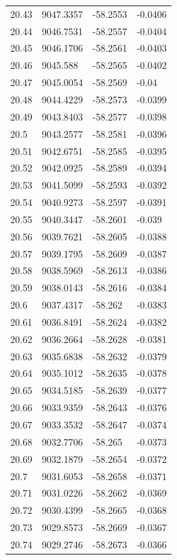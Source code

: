 \begin{table}[H]
\begin{tabular}{llll}
20.43 & 9047.3357 & -58.2553 & -0.0406 \\
20.44 & 9046.7531 & -58.2557 & -0.0404 \\
20.45 & 9046.1706 & -58.2561 & -0.0403 \\
20.46 & 9045.588 & -58.2565 & -0.0402 \\
20.47 & 9045.0054 & -58.2569 & -0.04 \\
20.48 & 9044.4229 & -58.2573 & -0.0399 \\
20.49 & 9043.8403 & -58.2577 & -0.0398 \\
20.5 & 9043.2577 & -58.2581 & -0.0396 \\
20.51 & 9042.6751 & -58.2585 & -0.0395 \\
20.52 & 9042.0925 & -58.2589 & -0.0394 \\
20.53 & 9041.5099 & -58.2593 & -0.0392 \\
20.54 & 9040.9273 & -58.2597 & -0.0391 \\
20.55 & 9040.3447 & -58.2601 & -0.039 \\
20.56 & 9039.7621 & -58.2605 & -0.0388 \\
20.57 & 9039.1795 & -58.2609 & -0.0387 \\
20.58 & 9038.5969 & -58.2613 & -0.0386 \\
20.59 & 9038.0143 & -58.2616 & -0.0384 \\
20.6 & 9037.4317 & -58.262 & -0.0383 \\
20.61 & 9036.8491 & -58.2624 & -0.0382 \\
20.62 & 9036.2664 & -58.2628 & -0.0381 \\
20.63 & 9035.6838 & -58.2632 & -0.0379 \\
20.64 & 9035.1012 & -58.2635 & -0.0378 \\
20.65 & 9034.5185 & -58.2639 & -0.0377 \\
20.66 & 9033.9359 & -58.2643 & -0.0376 \\
20.67 & 9033.3532 & -58.2647 & -0.0374 \\
20.68 & 9032.7706 & -58.265 & -0.0373 \\
20.69 & 9032.1879 & -58.2654 & -0.0372 \\
20.7 & 9031.6053 & -58.2658 & -0.0371 \\
20.71 & 9031.0226 & -58.2662 & -0.0369 \\
20.72 & 9030.4399 & -58.2665 & -0.0368 \\
20.73 & 9029.8573 & -58.2669 & -0.0367 \\
20.74 & 9029.2746 & -58.2673 & -0.0366 \\

\end{tabular}
\end{table}
